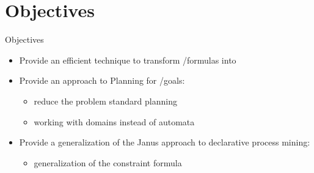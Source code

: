 \documentclass{beamer}
\begin{document}
\section{Objectives}
\begin{frame}{Objectives}
\begin{itemize}
	\item Provide an efficient technique to transform \LTLf/\PLTL formulas into \DFAs		
	\vskip 0.5cm
	\item Provide an approach to \FOND Planning for \LTLf/\PLTL goals:
		\begin{itemize}
			\item 	reduce the problem standard \FOND planning
			\item 	working with \FOND domains instead of automata
		\end{itemize}
	
	\vskip 0.5cm
	\item Provide a generalization of the Janus approach to declarative process mining:
			\begin{itemize}
				\item 	generalization of the constraint formula
			\end{itemize}	

\end{itemize}
\end{frame}
\end{document}
